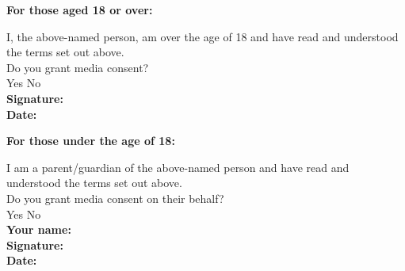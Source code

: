 \documentclass[a4paper,10pt]{article}
\newcommand{\checkbox}[1]{#1\hspace{0.2cm}\raisebox{-0.3mm}{$\square$}}
\newcommand{\textfield}[1]{\textbf{#1:} \hrulefill\hspace{0mm}}
\newcommand{\fieldsep}{\\[2.5mm]}
\begin{document}
\begin{minipage}[t]{0.48\textwidth}
\textbf{For those aged 18 or over:}

I, the above-named person, am over the age of 18 and have read and understood the terms set out above.\\

Do you grant media consent? \\[2mm]
\checkbox{Yes} \hspace{1cm} \checkbox{No}\\

\textfield{Signature} \fieldsep
\textfield{Date}
\end{minipage}
\hspace{0.02\textwidth}
\begin{minipage}[t]{0.48\textwidth}
\textbf{For those under the age of 18:}

I am a parent/guardian of the above-named person and have read and understood the terms set out above.\\

Do you grant media consent on their behalf?\\[2mm]
\checkbox{Yes} \hspace{1cm} \checkbox{No}\\

\textfield{Your name} \fieldsep
\textfield{Signature} \fieldsep
\textfield{Date}
\end{minipage}
\end{document}
